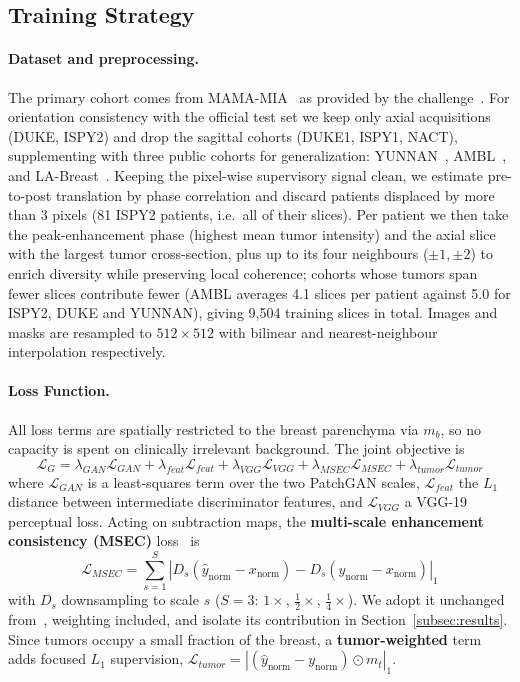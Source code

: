 \documentclass[runningheads,a4paper]{llncs}
\begin{document}
\subsection{Training Strategy}
\paragraph{Dataset and preprocessing.}
The primary cohort comes from MAMA-MIA~\cite{muller2022mama} as provided by the challenge~\cite{mamasynth2026}. For orientation consistency with the official test set we keep only axial acquisitions (DUKE, ISPY2) and drop the sagittal cohorts (DUKE1, ISPY1, NACT), supplementing with three public cohorts for generalization: YUNNAN~\cite{yunnan2024}, AMBL~\cite{ambl2024}, and LA-Breast~\cite{labreast2023}. Keeping the pixel-wise supervisory signal clean, we estimate pre-to-post translation by phase correlation and discard patients displaced by more than 3 pixels (81 ISPY2 patients, i.e.\ all of their slices). Per patient we then take the peak-enhancement phase (highest mean tumor intensity) and the axial slice with the largest tumor cross-section, plus up to its four neighbours ($\pm 1, \pm 2$) to enrich diversity while preserving local coherence; cohorts whose tumors span fewer slices contribute fewer (AMBL averages 4.1 slices per patient against 5.0 for ISPY2, DUKE and YUNNAN), giving 9,504 training slices in total. Images and masks are resampled to $512 \times 512$ with bilinear and nearest-neighbour interpolation respectively.

\paragraph{Loss Function.}
All loss terms are spatially restricted to the breast parenchyma via $m_b$, so no capacity is spent on clinically irrelevant background. The joint objective is
\begin{equation}
\mathcal{L}_G = \lambda_{GAN}\mathcal{L}_{GAN} + \lambda_{feat}\mathcal{L}_{feat} + \lambda_{VGG}\mathcal{L}_{VGG} + \lambda_{MSEC}\mathcal{L}_{MSEC} + \lambda_{tumor}\mathcal{L}_{tumor}
\end{equation}
where $\mathcal{L}_{GAN}$ is a least-squares term over the two PatchGAN scales, $\mathcal{L}_{feat}$ the $L_1$ distance between intermediate discriminator features, and $\mathcal{L}_{VGG}$ a VGG-19 perceptual loss. Acting on subtraction maps, the \textbf{multi-scale enhancement consistency (MSEC)} loss~\cite{yang2026miccai} is
\begin{equation}
\mathcal{L}_{MSEC} = \sum_{s=1}^{S} | D_s(\hat{y}_{\text{norm}} - x_{\text{norm}}) - D_s(y_{\text{norm}} - x_{\text{norm}}) |_1
\end{equation}
with $D_s$ downsampling to scale $s$ ($S=3$: $1\times$, $\frac{1}{2}\times$, $\frac{1}{4}\times$). We adopt it unchanged from~\cite{yang2026miccai}, weighting included, and isolate its contribution in Section~\ref{subsec:results}. Since tumors occupy a small fraction of the breast, a \textbf{tumor-weighted} term adds focused $L_1$ supervision, $\mathcal{L}_{tumor} = | (\hat{y}_{\text{norm}} - y_{\text{norm}}) \odot m_t |_1$.
\end{document}
